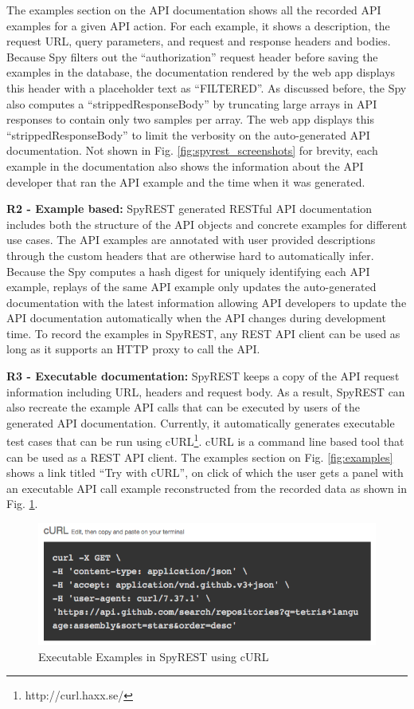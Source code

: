 \documentclass[conference]{IEEEtran}
\begin{document}
The examples section on the API documentation shows all the recorded API examples for a given API action. For each example, it shows a description, the request URL, query parameters, and request and response headers and bodies. Because Spy filters out the ``authorization'' request header before saving the examples in the database, the documentation rendered by the web app displays this header with a placeholder text as ``FILTERED''. As discussed before, the Spy also computes a ``strippedResponseBody'' by truncating large arrays in API responses to contain only two samples per array. The web app displays this ``strippedResponseBody'' to limit the verbosity on the auto-generated API documentation. Not shown in Fig. \ref{fig:spyrest_screenshots} for brevity, each example in the documentation also shows the information about the API developer that ran the API example and the time when it was generated.

\textbf{R2 - Example based:} SpyREST generated RESTful API documentation includes both the structure of the API objects and concrete examples for different use cases. The API examples are annotated with user provided descriptions through the custom headers that are otherwise hard to automatically infer. Because the Spy computes a hash digest for uniquely identifying each API example, replays of the same API example only updates the auto-generated documentation with the latest information allowing API developers to update the API documentation automatically when the API changes during development time. To record the examples in SpyREST, any REST API client can be used as long as it supports an HTTP proxy to call the API.

\textbf{R3 -  Executable documentation:} SpyREST keeps a copy of the API request information including URL, headers and request body. As a result, SpyREST can also recreate the example API calls that can be executed by users of the generated API documentation. Currently, it automatically generates executable test cases that can be run using cURL\footnote{http://curl.haxx.se/}. cURL is a command line based tool that can be used as a REST API client. The examples section on Fig. \ref{fig:examples} shows a link titled ``Try with cURL'', on click of which the user gets a panel with an executable API call example reconstructed from the recorded data as shown in Fig. \ref{fig:curl}.

\begin{figure}[!tbh]
  \centering
  \includegraphics[width=\linewidth]{curl.png}
  \caption{Executable Examples in SpyREST using cURL}
  \label{fig:curl}
\end{figure}
\end{document}
